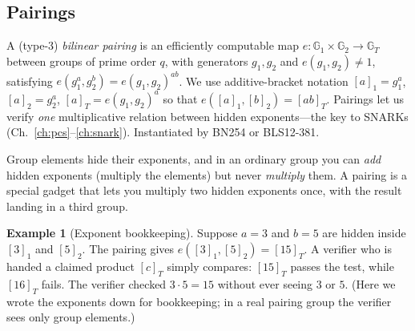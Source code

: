 \documentclass[11pt,a4paper]{report}
\theoremstyle{plain}
\theoremstyle{definition}
\newtheorem{example}[theorem]{Example}
\theoremstyle{remark}
\newcommand{\GG}{\mathbb{G}}
\begin{document}
\subsection{Pairings}
A (type-3) \emph{bilinear pairing} is an efficiently computable map $e:\GG_1\times\GG_2\to\GG_T$ between groups of prime order $q$, with generators $g_1,g_2$ and $e(g_1,g_2)\ne1$, satisfying $e(g_1^a,g_2^b)=e(g_1,g_2)^{ab}$. We use additive-bracket notation $[a]_1=g_1^a$, $[a]_2=g_2^a$, $[a]_T=e(g_1,g_2)^a$ so that $e([a]_1,[b]_2)=[ab]_T$. Pairings let us verify \emph{one} multiplicative relation between hidden exponents---the key to SNARKs (Ch.~\ref{ch:pcs}--\ref{ch:snark}). Instantiated by BN254 or BLS12-381.
\begin{plain}\PE
Group elements hide their exponents, and in an ordinary group you can \emph{add} hidden exponents (multiply the elements) but never \emph{multiply} them. A pairing is a special gadget that lets you multiply two hidden exponents once, with the result landing in a third group.
\end{plain}
\begin{example}[Exponent bookkeeping]
Suppose $a=3$ and $b=5$ are hidden inside $[3]_1$ and $[5]_2$. The pairing gives $e([3]_1,[5]_2)=[15]_T$. A verifier who is handed a claimed product $[c]_T$ simply compares: $[15]_T$ passes the test, while $[16]_T$ fails. The verifier checked $3\cdot5=15$ without ever seeing $3$ or $5$. (Here we wrote the exponents down for bookkeeping; in a real pairing group the verifier sees only group elements.)
\end{example}
\end{document}
